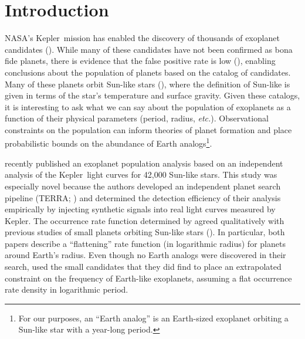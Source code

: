 \documentclass[12pt,preprint]{aastex}
\newcommand{\project}[1]{{\sffamily #1}}
\newcommand{\kepler}{\project{Kepler}}
\newcommand{\terra}{\project{TERRA}}
\newcommand{\foreign}[1]{\emph{#1}}
\newcommand{\etc}{\foreign{etc.}}
\begin{document}

\section{Introduction}

NASA's \kepler\ mission has enabled the discovery of thousands of exoplanet
candidates (\citealt{kepler-catalog}).
While many of these candidates have not been confirmed as bona fide planets,
there is evidence that the false positive rate is low (\citealt{morton,
fressin-fp}), enabling conclusions about the population of planets based on
the catalog of candidates.
Many of these planets orbit Sun-like stars (\citealt{petigura}), where the
definition of Sun-like is given in terms of the star's temperature and surface
gravity.
Given these catalogs, it is interesting to ask what we can say about the
population of exoplanets as a function of their physical parameters
(period, radius, \etc).
Observational constraints on the population can inform theories of planet
formation and place probabilistic bounds on the abundance of Earth
analogs\footnote{For our purposes, an ``Earth analog'' is an Earth-sized
exoplanet orbiting a Sun-like star with a year-long period.}.

\citet{petigura} recently published an exoplanet population analysis based on
an independent analysis of the \kepler\ light curves for 42,000 Sun-like
stars.
This study was especially novel because the authors developed an independent
planet search pipeline (\terra; \citealt{petigura-a}) and determined the
detection efficiency of their analysis empirically by injecting synthetic
signals into real light curves measured by \kepler.
The occurrence rate function determined by \citet{petigura} agreed
qualitatively with previous studies of small planets orbiting Sun-like stars
(\citealt{dong}).
In particular, both papers describe a ``flattening'' rate function (in
logarithmic radius) for planets around Earth's radius.
Even though no Earth analogs were discovered in their search, \citet{petigura}
used the small candidates that they did find to place an extrapolated
constraint on the frequency of Earth-like exoplanets, assuming a flat
occurrence rate density in logarithmic period.
\end{document}
